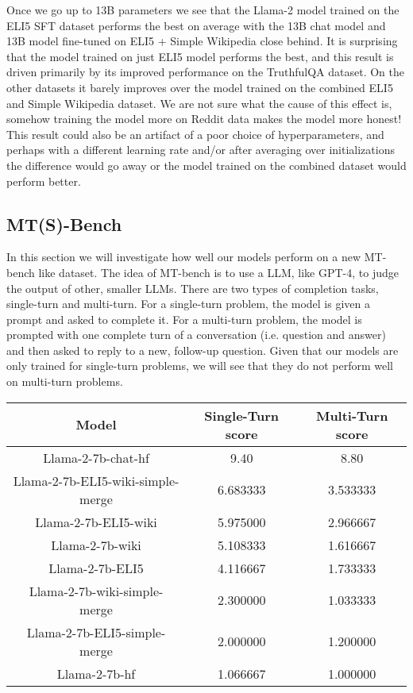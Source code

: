 \documentclass[11pt, oneside]{article}   	%
\begin{document}
Once we go up to 13B parameters we see that the Llama-2 model trained on the ELI5 SFT dataset performs the best on average with the 13B chat model and 13B model fine-tuned on ELI5 + Simple Wikipedia close behind.
It is surprising that the model trained on just ELI5 model performs the best, and this result is driven primarily by its improved performance on the TruthfulQA dataset. 
On the other datasets it barely improves over the model trained on the combined ELI5 and Simple Wikipedia dataset.
We are not sure what the cause of this effect is, somehow training the model more on Reddit data makes the model more honest!
This result could also be an artifact of a poor choice of hyperparameters, and perhaps with a different learning rate and/or after averaging over initializations the difference would go away or the model trained on the combined dataset would perform better.

\subsection{MT(S)-Bench}

In this section we will investigate how well our models perform on a new MT-bench like dataset.
The idea of MT-bench is to use a LLM, like GPT-4, to judge the output of other, smaller LLMs. 
There are two types of completion tasks, single-turn and multi-turn.
For a single-turn problem, the model is given a prompt and asked to complete it.
For a multi-turn problem, the model is prompted with one complete turn of a conversation (i.e. question and answer) and then asked to reply to a new, follow-up question. 
Given that our models are only trained for single-turn problems, we will see that they do not perform well on multi-turn problems.

\begin{center}
\begin{tabular}{c|c|c}
    \hline
    \textbf{Model} & \textbf{Single-Turn score}& \textbf{Multi-Turn score} \\
    \hline
    Llama-2-7b-chat-hf &  9.40 & 8.80\\ 
    Llama-2-7b-ELI5-wiki-simple-merge & 6.683333 & 3.533333  \\
    Llama-2-7b-ELI5-wiki &  5.975000 &  2.966667 \\
    Llama-2-7b-wiki &  5.108333 & 1.616667  \\
    Llama-2-7b-ELI5 &  4.116667 & 1.733333  \\
    Llama-2-7b-wiki-simple-merge &  2.300000& 1.033333  \\
    Llama-2-7b-ELI5-simple-merge & 2.000000 & 1.200000  \\
    Llama-2-7b-hf & 1.066667 &1.000000 \\
    \hline
\end{tabular}
\end{center}
\end{document}
